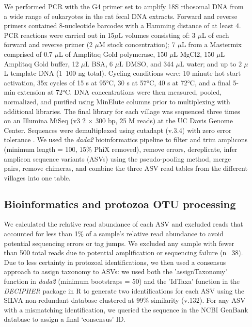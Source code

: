 \documentclass[oneside, a4paper, onecolumn, 11pt]{article}
\begin{document}
We performed PCR with the G4 primer set \citep{Gogarten2020-vf,Krogsgaard2018-lw} to amplify 18S ribosomal DNA from a wide range of eukaryotes in the rat fecal DNA extracts. Forward and reverse primers contained 8-nucleotide barcodes with a Hamming distance of at least 4. PCR reactions were carried out in 15$\mu$L volumes consisting of: 3 $\mu$L of each forward and reverse primer (2 $\mu$M stock concentration); 7 $\mu$L from a Mastermix comprised of 0.7 $\mu$L of Amplitaq Gold polymerase, 150 $\mu$L MgCl2, 150 $\mu$L Amplitaq Gold buffer, 12 $\mu$L BSA, 6 $\mu$L DMSO, and 344 $\mu$L water; and up to 2 $\mu$L template DNA (1–100 ng total). Cycling conditions were: 10-minute hot-start activation, 35x cycles of 15 s at 95°C, 30 s at 57°C, 40 s at 72°C, and a final 5-min extension at 72°C. DNA concentrations were then measured, pooled, normalized, and purified using MinElute columns prior to multiplexing with additional libraries. The final library for each village was sequenced three times on an Illumina MiSeq (v3 2 × 300 bp, 25 M reads) at the UC Davis Genome Center. Sequences were demultiplexed using cutadapt (v.3.4) with zero error tolerance \citep{Martin2011-yj}. We used the \textit{dada2} bioinformatics pipeline \citep{Callahan2016-wj} to filter and trim amplicons (minimum length = 100, 15\% PhiX removed), remove errors, dereplicate, infer amplicon sequence variants (ASVs) using the pseudo-pooling method, merge pairs, remove chimeras, and combine the three ASV read tables from the different villages into one table.

\subsection*{Bioinformatics and protozoa OTU processing}
We calculated the relative read abundance of each ASV and excluded reads that accounted for less than 1\% of a sample's relative read abundance to avoid potential sequencing errors or tag jumps. We excluded any sample with fewer than 500 total reads due to potential amplification or sequencing failure (n=38). Due to less certainty in protozoal identifications, we then used a consensus approach to assign taxonomy to ASVs: we used both the 'assignTaxonomy' function in \textit{dada2} (minimum bootstraps = 50) and the 'IdTaxa' function in the \textit{DECIPHER} package in R \citep{Murali2018-hm} to generate two identifications for each ASV using the SILVA non-redundant database clustered at 99\% similarity (v.132). For any ASV with a mismatching identification, we queried the sequence in the NCBI GenBank database to assign a final ‘consensus’ ID.
\end{document}
